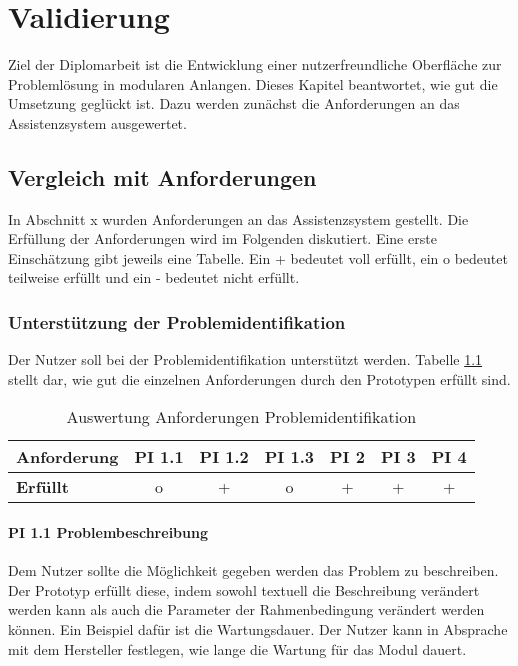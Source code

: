 \chapter{Validierung}
\label{Validierung}

Ziel der Diplomarbeit ist die Entwicklung einer nutzerfreundliche Oberfläche zur Problemlösung in modularen Anlangen. Dieses Kapitel beantwortet, wie gut die Umsetzung geglückt ist. Dazu werden zunächst die Anforderungen an das Assistenzsystem ausgewertet. 

\section{Vergleich mit Anforderungen}
In Abschnitt x wurden Anforderungen an das Assistenzsystem gestellt. Die Erfüllung der Anforderungen wird im Folgenden diskutiert. Eine erste Einschätzung gibt jeweils eine Tabelle. Ein + bedeutet voll erfüllt, ein o bedeutet teilweise erfüllt und ein - bedeutet nicht erfüllt.

\subsection{Unterstützung der Problemidentifikation}
Der Nutzer soll bei der Problemidentifikation unterstützt werden. Tabelle \ref{tab:Anforderungen-Problemidentifikation} stellt dar, wie gut die einzelnen Anforderungen durch den Prototypen erfüllt sind.
\begin{table}[htbp]
\centering
\begin{tabular}{l|c|c|c|c|c|c}
\textbf{Anforderung} & PI 1.1 & PI 1.2 & PI 1.3 & PI 2 & PI 3 & PI 4 \\
\hline
\textbf{Erfüllt} & o & + & o & + & + & + \\
\end{tabular}
\caption{Auswertung Anforderungen Problemidentifikation}
\label{tab:Anforderungen-Problemidentifikation}
\end{table}

\subsubsection*{PI 1.1 Problembeschreibung}
Dem Nutzer sollte die Möglichkeit gegeben werden das Problem zu beschreiben. Der Prototyp erfüllt diese, indem sowohl textuell die Beschreibung verändert werden kann als auch die Parameter der Rahmenbedingung verändert werden können. Ein Beispiel dafür ist die Wartungsdauer. Der Nutzer kann in Absprache mit dem Hersteller festlegen, wie lange die Wartung für das Modul dauert.

